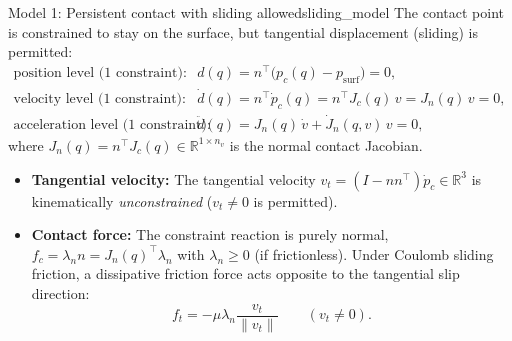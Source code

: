 \documentclass[11pt,a4paper]{article}
\newcommand{\R}{\mathbb{R}}
\begin{document}
\begin{definition}{Model 1: Persistent contact with sliding allowed}{sliding_model}
The contact point is constrained to stay on the surface, but tangential displacement (sliding) is permitted:
\begin{align}
  \text{position level ($1$ constraint):}\quad & d(q) = n^\top\big(p_c(q) - p_{\text{surf}}\big) = 0, \label{eq:slide_pos}\\
  \text{velocity level ($1$ constraint):}\quad & \dot d(q) = n^\top \dot p_c(q) = n^\top J_c(q)\,v = J_n(q)\,v = 0, \label{eq:slide_vel}\\
  \text{acceleration level ($1$ constraint):}\quad & \ddot d(q) = J_n(q)\,\dot v + \dot J_n(q,v)\,v = 0, \label{eq:slide_acc}
\end{align}
where $J_n(q) = n^\top J_c(q) \in \R^{1 \times n_v}$ is the normal contact Jacobian.
\begin{itemize}[nosep]
  \item \textbf{Tangential velocity:} The tangential velocity $v_t = (I - n n^\top)\dot p_c \in \R^3$ is kinematically \emph{unconstrained} ($v_t \neq 0$ is permitted).
  \item \textbf{Contact force:} The constraint reaction is purely normal, $f_c = \lambda_n n = J_n(q)^\top \lambda_n$ with $\lambda_n \ge 0$ (if frictionless). Under Coulomb sliding friction, a dissipative friction force acts opposite to the tangential slip direction:
  \[
    f_t = -\mu \lambda_n \frac{v_t}{\|v_t\|} \qquad (v_t \neq 0).
  \]
\end{itemize}
\end{definition}
\end{document}
